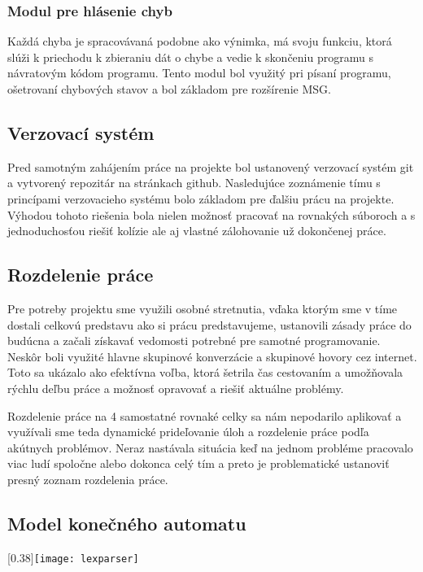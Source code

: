 \documentclass[a4paper]{article}
\begin{document}
\subsubsection{Modul pre hlásenie chyb}
Každá chyba je spracovávaná podobne ako výnimka, má svoju funkciu, ktorá slúži k priechodu k zbieraniu dát o chybe a vedie k skončeniu programu s návratovým kódom programu. Tento modul bol využitý pri písaní programu, ošetrovaní chybových stavov a bol základom pre rozšírenie MSG.

\subsection{Verzovací systém}
Pred samotným zahájením práce na projekte bol ustanovený verzovací systém git a vytvorený repozitár na stránkach github. Nasledujúce zoznámenie tímu s princípami verzovacieho systému bolo základom pre ďalšiu prácu na projekte. Výhodou tohoto riešenia bola nielen možnosť pracovať na rovnakých súboroch a s jednoduchosťou riešiť kolízie ale aj vlastné zálohovanie už dokončenej práce.
 
\subsection{Rozdelenie práce}
Pre potreby projektu sme využili osobné stretnutia, vďaka ktorým sme v tíme dostali celkovú predstavu ako si prácu predstavujeme, ustanovili zásady práce do budúcna a začali získavať vedomosti potrebné pre samotné programovanie. Neskôr boli využité hlavne skupinové konverzácie a skupinové hovory cez internet. Toto sa ukázalo ako efektívna voľba, ktorá šetrila čas cestovaním a umožňovala rýchlu deľbu práce a možnosť opravovať a riešiť aktuálne problémy.

Rozdelenie práce na 4 samostatné rovnaké celky sa nám nepodarilo aplikovať a využívali sme teda dynamické prideľovanie úloh a rozdelenie práce podľa akútnych problémov. Neraz nastávala situácia keď na jednom probléme pracovalo viac ludí spoločne alebo dokonca celý tím a preto je problematické ustanoviť presný zoznam rozdelenia práce.

\clearpage
\begin{landscape}
\section{Model konečného automatu}
\scalebox{0.40}[0.38]{\texttt{[image: lexparser]}}
\end{landscape}
\end{document}
